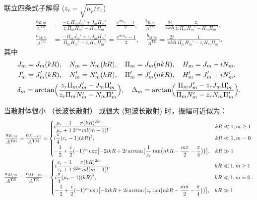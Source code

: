 \begin{exbox}
	联立四条式子解得 (\(z_r = \sqrt{\mu_r/\varepsilon_r}\))
	\begin{align*}
		\frac{a_{E,m}}{A^{\mathrm{TM}}} &= \frac{-z_r \Pi_m J_m' + J_m \Pi_m'}{z_r \Pi_m H_m' - H_m \Pi_m'} = \frac{e^{2i\delta_m} - 1}{2}, \quad
		\frac{b_{E,m}}{A^{\mathrm{TM}}} = \frac{2i}{\pi k R} \frac{z_r}{z_r \Pi_m H_m' - H_m \Pi_m'}.\\
		\frac{a_{M,m}}{A^{\mathrm{TE}}} &= \frac{-\Pi_m J_m' + z_r J_m \Pi_m'}{\Pi_m H_m' - z_r H_m \Pi_m'} = \frac{e^{2i\Delta_m} - 1}{2}, \quad
		\frac{b_{M,m}}{A^{\mathrm{TE}}} = \frac{2i}{\pi k R} \frac{1}{\Pi_m H_m' - z_r H_m \Pi_m'}.
	\end{align*}
	其中
	\begin{align*}
		&J_m = J_m(kR),\quad N_m = N_m(kR),\quad\Pi_m = J_m(nkR),\quad H_m = J_m + iN_m.\\
		&J_m' = J_m'(kR),\quad N_m' = N_m'(kR),\quad \Pi_m' = J_m'(nkR),\quad H_m' = J_m' + iN_m'.\\
		&\delta_m = \arctan\Bigl(\frac{z_r\Pi_mJ_m' - J_m\Pi_m'}{z_r\Pi_mN_m' - N_m\Pi_m'}\Bigr),\quad\Delta_m = \arctan\Bigl(\frac{\Pi_mJ_m' - z_rJ_m\Pi_m'}{\Pi_mN_m' - z_rN_m\Pi_m'}\Bigr).
	\end{align*}

	当散射体很小 （长波长散射） 或很大 (短波长散射) 时，振幅可近似为：
	\begin{align*}
		\frac{a_{E,m}}{A^{\rm TM}}&=\frac{a_{E,-m}}{A^{\rm TM}}=
		\begin{cases}
			i\dfrac{\mu_r-1}{\mu_r+1}\dfrac{\pi(kR)^{2m}}{2^{2m}m!(m-1)!},                                                                               & kR\ll1,m\geq1 \\[6pt]
			i\dfrac{\pi}{4}(\varepsilon_r-1)(kR)^2,                                                                                                      & kR\ll1,m=0    \\[6pt]
			-\dfrac{1}{2}+\dfrac{i}{2}(-1)^m\exp\bigl[-2ikR+2i\arctan\bigl(\dfrac{1}{z_r}\tan\bigl(nkR-\dfrac{m\pi}{2}-\dfrac{\pi}{4}\bigr)\bigr)\bigr], & kR\gg1
		\end{cases}\\
		\frac{a_{M,m}}{A^{\rm TE}}&=\frac{a_{M,-m}}{A^{\rm TE}}=
		\begin{cases}
			i\dfrac{\varepsilon_r-1}{\varepsilon_r+1}\dfrac{\pi(kR)^{2m}}{2^{2m}m!(m-1)!},                                                    & kR\ll1,m\geq1 \\[6pt]
			i\dfrac{\pi}{4}(\mu_r-1)(kR)^2,                                                                                                   & kR\ll1,m=0    \\[6pt]
			-\dfrac{1}{2}+\dfrac{i}{2}(-1)^m\exp\bigl[-2ikR+2i\arctan\bigl(z_r\tan\bigl(nkR-\dfrac{m\pi}{2}-\dfrac{\pi}{4}\bigr)\bigr)\bigr], & kR\gg1
		\end{cases}.
	\end{align*}


\end{exbox}

